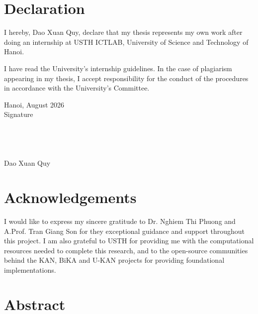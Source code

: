 \documentclass[a4paper]{report}
\begin{document}
\clearpage
{}  %
\setcounter{page}{1}   %


\tableofcontents

\listoffigures
{}
\clearpage

\listoftables
{}

\printglossary[type=\acronymtype,title=List of Abbreviations]




\newpage
\chapter*{Declaration}
I hereby, Dao Xuan Quy, declare that my thesis represents my own work after doing an internship at USTH ICTLAB, University of Science and Technology of Hanoi.

I have read the University's internship guidelines. In the case of plagiarism appearing in my thesis, I accept responsibility for the conduct of the procedures in accordance with the
University's Committee.

Hanoi, August 2026\\

Signature\\
\\
\\
\\
\\
Dao Xuan  Quy


\chapter*{Acknowledgements}
 I would like to express my sincere gratitude to Dr. Nghiem Thi Phuong and A.Prof. Tran Giang Son for they exceptional guidance and support throughout this project. I am also grateful to USTH for providing me with the computational resources needed to complete this research, and to the open-source communities behind the KAN, BiKA and U-KAN projects for providing foundational implementations.

\chapter*{Abstract}
\end{document}

